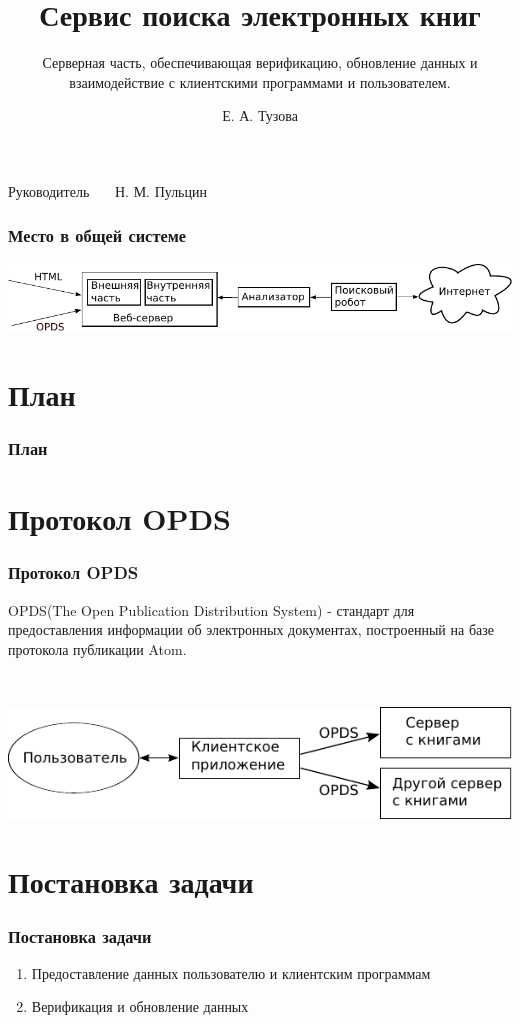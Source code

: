 \documentclass[utf8,handout]{beamer}
\title{Сервис поиска электронных книг }
\subtitle{Серверная часть, обеспечивающая верификацию, обновление данных и взаимодействие с клиентскими программами и пользователем.}
\author{Е. А. Тузова}
\institute{АУ РАН}
\date{}
\begin{document}
\begin{frame}
  \titlepage

  \begin{flushright}
  
    Руководитель~~~  Н. М. Пульцин

  \end{flushright}
\end{frame}


\begin{frame}
	\frametitle{Место в общей системе}
	\includegraphics[width=1.05\textwidth]{./head/innerstructure-new}
\end{frame}

\section*{План}
  \begin{frame}
    \frametitle{План}
    \tableofcontents[pausesections]

  \end{frame}

\section{Протокол OPDS}
  \begin{frame}
    \frametitle{Протокол OPDS}
    \begin{block}{}
	OPDS(The Open Publication Distribution System) - стандарт для предоставления информации об электронных документах, построенный на базе протокола публикации Atom.
	\end{block}
	\ 
    
	\includegraphics{./head/scheme}
  \end{frame}

\section{Постановка задачи}
  \begin{frame}

    \frametitle{Постановка задачи}
    \begin{enumerate}
      \item Предоставление данных пользователю и клиентским программам
      \item Верификация и обновление данных
    \end{enumerate}
  \end{frame}
\end{document}
